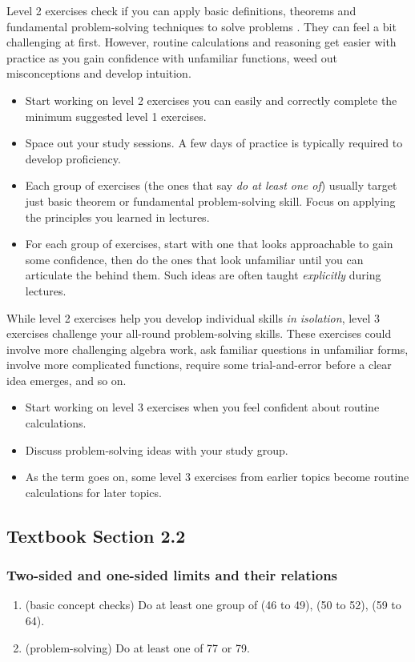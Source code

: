 \documentclass[../main.tex]{subfiles}
\begin{document}
Level 2 exercises check if you can apply basic definitions, theorems and fundamental problem-solving techniques to solve problems . They can feel a bit challenging at first. However, routine calculations and reasoning get easier with practice as you gain confidence with unfamiliar functions, weed out misconceptions and develop intuition. 
\begin{itemize}
  \item Start working on level 2 exercises  you can easily and correctly complete the minimum suggested level 1 exercises.
  \item Space out your study sessions. A few days of practice is typically required to develop proficiency.
  \item Each group of exercises (the ones that say \emph{do at least one of}) usually target just  basic theorem or fundamental problem-solving skill. Focus on applying the principles you learned in lectures. 
  \item For each group of exercises, start with one that looks approachable to gain some confidence, then do the ones that look unfamiliar until you can articulate the  behind them. Such ideas are often taught \emph{explicitly} during lectures.
\end{itemize}

While level 2 exercises help you develop individual skills \emph{in isolation}, level 3 exercises challenge your all-round problem-solving skills. These exercises could involve more challenging algebra work, ask familiar questions in unfamiliar forms, involve more complicated functions, require some trial-and-error before a clear idea emerges, and so on.
\begin{itemize}
  \item Start working on level 3 exercises when you feel confident about routine calculations. 
  \item Discuss problem-solving ideas with your study group. 
  \item As the term goes on, some level 3 exercises from earlier topics become routine calculations for later topics.
\end{itemize}
\clearpage

\subsection*{Textbook Section 2.2} 
\subsubsection{Two-sided and one-sided limits and their relations}
\begin{enumerate}
  \item (basic concept checks) Do at least one group of (46 to 49), (50 to 52), (59 to 64). 
  \item (problem-solving) Do at least one of 77 or 79.
\end{enumerate}
\end{document}
